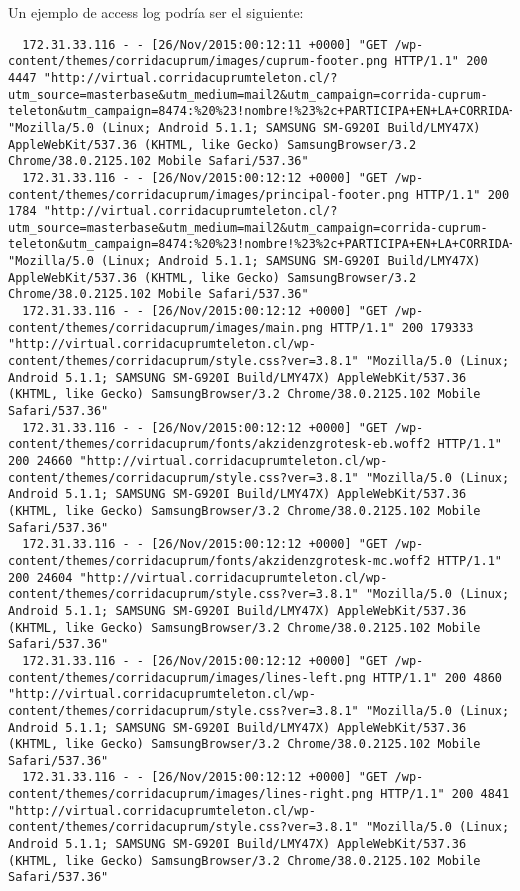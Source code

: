   Un ejemplo de access log podría ser el siguiente:


\begin{verbatim}
  172.31.33.116 - - [26/Nov/2015:00:12:11 +0000] "GET /wp-content/themes/corridacuprum/images/cuprum-footer.png HTTP/1.1" 200 4447 "http://virtual.corridacuprumteleton.cl/?utm_source=masterbase&utm_medium=mail2&utm_campaign=corrida-cuprum-teleton&utm_campaign=8474:%20%23!nombre!%23%2c+PARTICIPA+EN+LA+CORRIDA+VIRTUAL+Y+APOYA++A+LA+TELETON&utm_source=MasterBase%20CUPRUM&utm_medium=email&utm_content=2&utm_term=none" "Mozilla/5.0 (Linux; Android 5.1.1; SAMSUNG SM-G920I Build/LMY47X) AppleWebKit/537.36 (KHTML, like Gecko) SamsungBrowser/3.2 Chrome/38.0.2125.102 Mobile Safari/537.36"
  172.31.33.116 - - [26/Nov/2015:00:12:12 +0000] "GET /wp-content/themes/corridacuprum/images/principal-footer.png HTTP/1.1" 200 1784 "http://virtual.corridacuprumteleton.cl/?utm_source=masterbase&utm_medium=mail2&utm_campaign=corrida-cuprum-teleton&utm_campaign=8474:%20%23!nombre!%23%2c+PARTICIPA+EN+LA+CORRIDA+VIRTUAL+Y+APOYA++A+LA+TELETON&utm_source=MasterBase%20CUPRUM&utm_medium=email&utm_content=2&utm_term=none" "Mozilla/5.0 (Linux; Android 5.1.1; SAMSUNG SM-G920I Build/LMY47X) AppleWebKit/537.36 (KHTML, like Gecko) SamsungBrowser/3.2 Chrome/38.0.2125.102 Mobile Safari/537.36"
  172.31.33.116 - - [26/Nov/2015:00:12:12 +0000] "GET /wp-content/themes/corridacuprum/images/main.png HTTP/1.1" 200 179333 "http://virtual.corridacuprumteleton.cl/wp-content/themes/corridacuprum/style.css?ver=3.8.1" "Mozilla/5.0 (Linux; Android 5.1.1; SAMSUNG SM-G920I Build/LMY47X) AppleWebKit/537.36 (KHTML, like Gecko) SamsungBrowser/3.2 Chrome/38.0.2125.102 Mobile Safari/537.36"
  172.31.33.116 - - [26/Nov/2015:00:12:12 +0000] "GET /wp-content/themes/corridacuprum/fonts/akzidenzgrotesk-eb.woff2 HTTP/1.1" 200 24660 "http://virtual.corridacuprumteleton.cl/wp-content/themes/corridacuprum/style.css?ver=3.8.1" "Mozilla/5.0 (Linux; Android 5.1.1; SAMSUNG SM-G920I Build/LMY47X) AppleWebKit/537.36 (KHTML, like Gecko) SamsungBrowser/3.2 Chrome/38.0.2125.102 Mobile Safari/537.36"
  172.31.33.116 - - [26/Nov/2015:00:12:12 +0000] "GET /wp-content/themes/corridacuprum/fonts/akzidenzgrotesk-mc.woff2 HTTP/1.1" 200 24604 "http://virtual.corridacuprumteleton.cl/wp-content/themes/corridacuprum/style.css?ver=3.8.1" "Mozilla/5.0 (Linux; Android 5.1.1; SAMSUNG SM-G920I Build/LMY47X) AppleWebKit/537.36 (KHTML, like Gecko) SamsungBrowser/3.2 Chrome/38.0.2125.102 Mobile Safari/537.36"
  172.31.33.116 - - [26/Nov/2015:00:12:12 +0000] "GET /wp-content/themes/corridacuprum/images/lines-left.png HTTP/1.1" 200 4860 "http://virtual.corridacuprumteleton.cl/wp-content/themes/corridacuprum/style.css?ver=3.8.1" "Mozilla/5.0 (Linux; Android 5.1.1; SAMSUNG SM-G920I Build/LMY47X) AppleWebKit/537.36 (KHTML, like Gecko) SamsungBrowser/3.2 Chrome/38.0.2125.102 Mobile Safari/537.36"
  172.31.33.116 - - [26/Nov/2015:00:12:12 +0000] "GET /wp-content/themes/corridacuprum/images/lines-right.png HTTP/1.1" 200 4841 "http://virtual.corridacuprumteleton.cl/wp-content/themes/corridacuprum/style.css?ver=3.8.1" "Mozilla/5.0 (Linux; Android 5.1.1; SAMSUNG SM-G920I Build/LMY47X) AppleWebKit/537.36 (KHTML, like Gecko) SamsungBrowser/3.2 Chrome/38.0.2125.102 Mobile Safari/537.36"
  	

\end{verbatim}
